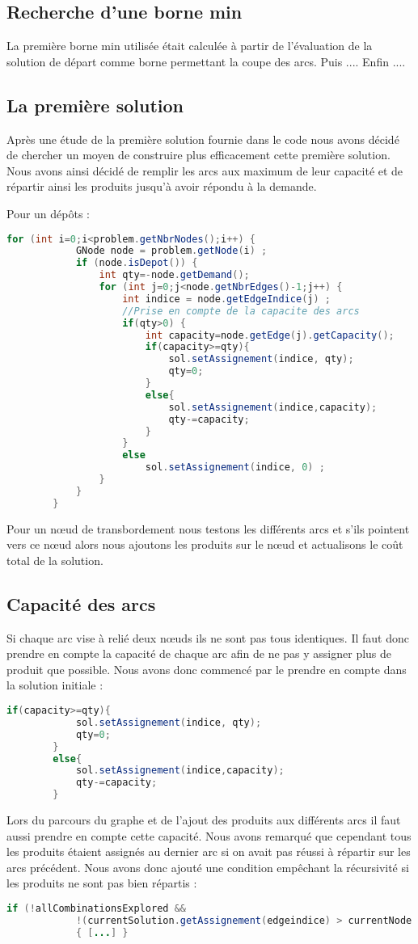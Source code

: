 \documentclass[french]{article}
\begin{document}
	\subsection{Recherche d'une borne min}
	La première borne min utilisée était calculée à partir de l'évaluation de la solution de départ comme borne permettant la coupe des arcs.
	Puis ....
	Enfin ....
	
	\subsection{La première solution}
	Après une étude de la première solution fournie dans le code nous avons décidé de chercher un moyen de construire plus efficacement cette première solution. Nous avons ainsi décidé de remplir les arcs aux maximum de leur capacité et de répartir ainsi les produits jusqu'à avoir répondu à la demande.
	
	Pour un dépôts :
	\begin{lstlisting}[language=Java]
		for (int i=0;i<problem.getNbrNodes();i++) {
			GNode node = problem.getNode(i) ;
			if (node.isDepot()) {
				int qty=-node.getDemand();
				for (int j=0;j<node.getNbrEdges()-1;j++) {
					int indice = node.getEdgeIndice(j) ;
					//Prise en compte de la capacite des arcs
					if(qty>0) {
						int capacity=node.getEdge(j).getCapacity();
						if(capacity>=qty){
							sol.setAssignement(indice, qty);
							qty=0;
						}
						else{
							sol.setAssignement(indice,capacity);
							qty-=capacity;
						}
					}
					else
						sol.setAssignement(indice, 0) ;
				}
			}
		}
	\end{lstlisting}
	Pour un nœud de transbordement nous testons les différents arcs et s'ils pointent vers ce nœud alors nous ajoutons les produits sur le nœud et actualisons le coût total de la solution.
	
	\subsection{Capacité des arcs}
	Si chaque arc vise à relié deux nœuds ils ne sont pas tous identiques. Il faut donc prendre en compte la capacité de chaque arc afin de ne pas y assigner plus de produit que possible. Nous avons donc commencé par le prendre en compte dans la solution initiale :
	\begin{lstlisting}[language=Java, caption=Test capacité des arcs]
		if(capacity>=qty){
			sol.setAssignement(indice, qty);
			qty=0;
		}
		else{
			sol.setAssignement(indice,capacity);
			qty-=capacity;
		}
	\end{lstlisting}
	Lors du parcours du graphe et de l'ajout des produits aux différents arcs il faut aussi prendre en compte cette capacité. Nous avons remarqué que cependant tous les produits étaient assignés au dernier arc si on avait pas réussi à répartir sur les arcs précédent. Nous avons donc ajouté une condition empêchant la récursivité si les produits ne sont pas bien répartis :
	\begin{lstlisting}[language=Java]
		if (!allCombinationsExplored &&
			!(currentSolution.getAssignement(edgeindice) > currentNode.getEdge(currentNode.getNbrEdges()-1).getCapacity())) 
			{ [...] }
	\end{lstlisting}
	
\end{document}
